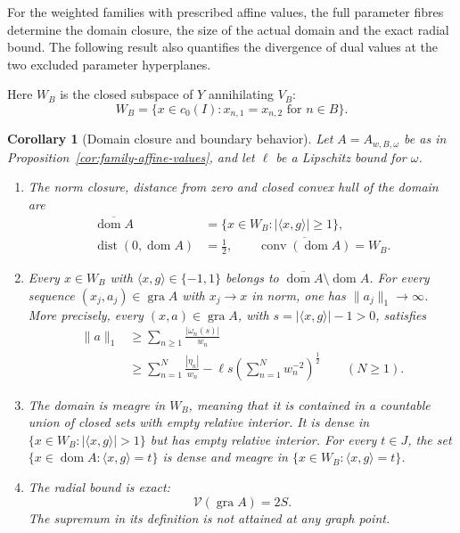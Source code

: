 \documentclass[11pt]{article}
\newcommand{\gra}{\operatorname{gra}}
\newcommand{\dom}{\operatorname{dom}}
\newcommand{\pair}[2]{\langle #1,#2\rangle}
\newtheorem{corollary}{Corollary}
\theoremstyle{definition}
\theoremstyle{remark}
\newcommand{\dist}{\operatorname{dist}}
\begin{document}
For the weighted families with prescribed affine values, the full parameter fibres determine the domain closure, the size of the actual domain and the exact radial bound. The following result also quantifies the divergence of dual values at the two excluded parameter hyperplanes.

Here $W_B$ is the closed subspace of $Y$ annihilating $V_B$:
\begin{equation}
W_B=\{x\in c_0(I):x_{n,1}=x_{n,2}\text{ for }n\in B\}.
\label{eq:family-primal-subspace}
\end{equation}

\begin{corollary}[Domain closure and boundary behavior]
\label{cor:family-domain-geometry}
Let $A=A_{w,B,\omega}$ be as in Proposition~\ref{cor:family-affine-values}, and let $\ell$ be a Lipschitz bound for $\omega$.
\begin{enumerate}
\item The norm closure, distance from zero and closed convex hull of the domain are
\begin{equation}
\begin{aligned}
\overline{\dom A}&=\{x\in W_B:|\pair{x}{g}|\ge1\},\\
\dist(0,\dom A)&=\frac12,\qquad
\overline{\operatorname{conv}(\dom A)}=W_B.
\end{aligned}
\label{eq:family-domain-closure}
\end{equation}
\item Every $x\in W_B$ with $\pair{x}{g}\in\{-1,1\}$ belongs to $\overline{\dom A}\setminus\dom A$. For every sequence $(x_j,a_j)\in\gra A$ with $x_j\to x$ in norm, one has $\|a_j\|_1\to\infty$. More precisely, every $(x,a)\in\gra A$, with $s=|\pair{x}{g}|-1>0$, satisfies
\begin{equation}
\begin{aligned}
\|a\|_1&\ge\sum_{n\ge1}\frac{|\omega_n(s)|}{w_n}\\
&\ge\sum_{n=1}^N\frac{|\eta_n|}{w_n}
-\ell s\left(\sum_{n=1}^Nw_n^{-2}\right)^{\frac12}
\qquad(N\ge1).
\end{aligned}
\label{eq:family-boundary-bound}
\end{equation}
\item The domain is meagre in $W_B$, meaning that it is contained in a countable union of closed sets with empty relative interior. It is dense in $\{x\in W_B:|\pair{x}{g}|>1\}$ but has empty relative interior. For every $t\in J$, the set $\{x\in\dom A:\pair{x}{g}=t\}$ is dense and meagre in $\{x\in W_B:\pair{x}{g}=t\}$.
\item The radial bound is exact:
\begin{equation}
\mathcal V(\gra A)=2S.
\label{eq:family-exact-radial}
\end{equation}
The supremum in its definition is not attained at any graph point.
\end{enumerate}
\end{corollary}
\end{document}
